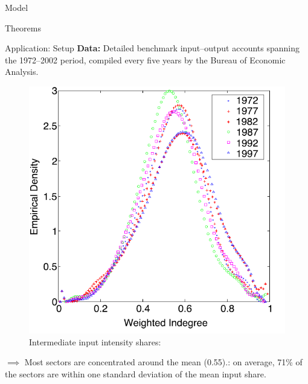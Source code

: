 \documentclass[dvipsnames]{beamer}
\begin{document}
\begin{frame}{Model}
    \justifying
  
\end{frame}

\begin{frame}{Theorems}
    \justifying
  
\end{frame}

\begin{frame}{Application: Setup}
    \justifying
  {\bf Data:} Detailed
  benchmark input–output accounts spanning the 1972–2002 period, compiled
  every five years by the Bureau of Economic Analysis.\\[5pt]
\begin{figure}[H]
    \caption*{ Intermediate input intensity shares:}
    \includegraphics[scale=0.6]{4}
    \centering
\end{figure}   

$\implies$ Most sectors are concentrated around the mean (0.55).: on average, 71\% of the sectors are within one
standard deviation of the mean input share.
\end{frame}
\end{document}
